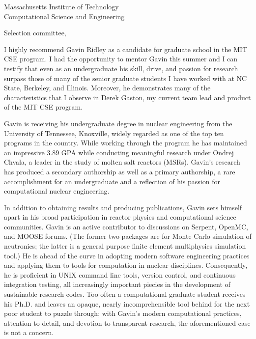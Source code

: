 \documentclass[12pt]{letter}
\begin{document}
\signature{Dr. Alexander Lindsay\\ INL Computational Scientist\\ MOOSE team member\\\url{alexander.lindsay@inl.gov}}

\begin{letter}{Massachusetts Institute of Technology \\ Computational Science and Engineering}
\opening{Selection committee,}

I highly recommend Gavin Ridley as a candidate for graduate school in the MIT
CSE program. I had the
opportunity to mentor Gavin this summer and I can testify that even as an
undergraduate his skill, drive, and passion for research surpass those of many
of the senior graduate students I have worked with at NC State, Berkeley, and
Illinois. Moreover, he demonstrates many of the characteristics that I observe
in Derek Gaston, my current team lead and product of the MIT CSE program.

Gavin is receiving his undergraduate degree in nuclear engineering from the
University of Tennessee, Knoxville, widely regarded as one of the top ten
programs in the country. While working through the program he has maintained an
impressive 3.89 GPA while conducting meaningful research under Ondrej Chvala, a
leader in the study of molten salt reactors (MSRs). Gavin's research has
produced a secondary authorship as well as a primary authorship, a rare
accomplishment for an undergraduate and a reflection of his passion for
computational nuclear engineering.

In addition to obtaining results and producing publications, Gavin sets himself apart
in his broad participation in reactor physics and computational
science communities. Gavin is an active contributor to discussions on Serpent,
OpenMC, and MOOSE forums. (The former two packages are for Monte Carlo simulation
of neutronics; the latter is a general purpose finite element multiphysics
simulation tool.) He is ahead of the curve in adopting modern software
engineering practices and applying them to tools for computation in nuclear
disciplines. Consequently, he is proficient in UNIX command line tools, version
control, and continuous integration testing, all increasingly important piecies
in the development of sustainable research codes. Too often a computational
graduate student receives his Ph.D. and leaves an opaque, nearly
incomprehensible tool behind for the next poor student to puzzle through; with
Gavin's modern computational practices, attention to detail, and devotion to
transparent research, the aforementioned case is not a concern.


\end{letter}
\end{document}
